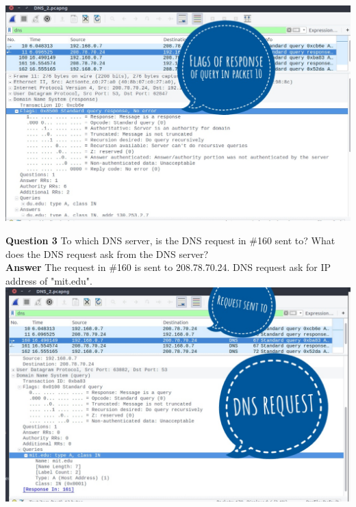 \documentclass[14pt]{extarticle}
\begin{document}
    \includegraphics[scale=0.45]{2_2_2}\\[10pt] 
    \vspace{1cm}

    \noindent
    \textbf{\large Question 3}
    To which DNS server, is the DNS request in \#160 sent to? 
    What does the DNS request ask from the DNS server?\\[10pt]
    \textbf{\large Answer}
    The request in \#160 is sent to 208.78.70.24. DNS request ask for IP address of "mit.edu".\\[10pt]        
    \includegraphics[scale=0.45]{2_3_1}\\[10pt] 
    \vspace{1cm}
\end{document}
